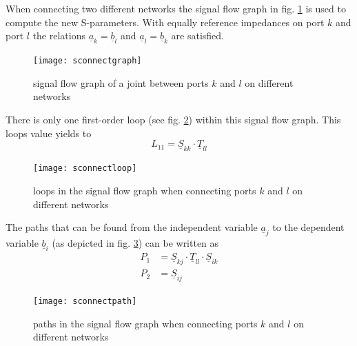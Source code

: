 \documentclass[10pt]{report}
\begin{document}
\addvspace{12pt}

When connecting two different networks the signal flow graph in
fig. \ref{fig:sconnectgraph} is used to compute the new S-parameters.
With equally reference impedances on port $k$ and port $l$ the
relations $\underline{a}_{k} = \underline{b}_{l}$ and
$\underline{a}_{l} = \underline{b}_{k}$ are satisfied.

\begin{figure}[ht]
\begin{center}
\texttt{[image: sconnectgraph]}
\end{center}
\caption{signal flow graph of a joint between ports $k$ and $l$ on different networks}
\label{fig:sconnectgraph}
\end{figure}
\FloatBarrier

There is only one first-order loop (see fig. \ref{fig:sconnectloop})
within this signal flow graph.  This loops value yields to
\begin{equation}
L_{11} = \underline{S}_{kk}\cdot \underline{T}_{ll}
\end{equation}

\begin{figure}[ht]
\begin{center}
\texttt{[image: sconnectloop]}
\end{center}
\caption{loops in the signal flow graph when connecting ports $k$ and $l$ on different networks}
\label{fig:sconnectloop}
\end{figure}
\FloatBarrier

The paths that can be found from the independent variable
$\underline{a}_{j}$ to the dependent variable $\underline{b}_{i}$ (as
depicted in fig. \ref{fig:sconnectpath}) can be written as
\begin{align}
P_{1} &= \underline{S}_{kj}\cdot \underline{T}_{ll} \cdot \underline{S}_{ik}\\
P_{2} &= \underline{S}_{ij}
\end{align}

\begin{figure}[ht]
\begin{center}
\texttt{[image: sconnectpath]}
\end{center}
\caption{paths in the signal flow graph when connecting ports $k$ and $l$ on different networks}
\label{fig:sconnectpath}
\end{figure}
\FloatBarrier
\end{document}
